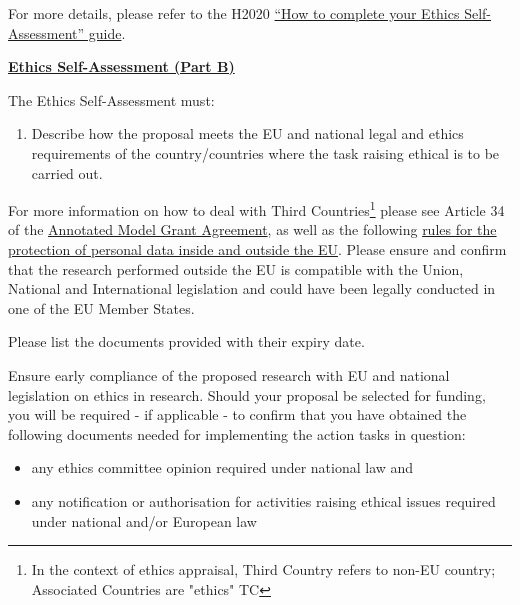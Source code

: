 For more details, please refer to the H2020
\href{http://ec.europa.eu/research/participants/data/ref/h2020/grants_manual/hi/ethics/h2020_hi_ethics-self-assess_en.pdf}{``How
to complete your Ethics Self-Assessment'' guide}.

\bigskip\noindent

{\large {\bf \ul{Ethics Self-Assessment (Part B)}}}

\medskip\noindent
The Ethics Self-Assessment must:

{\bf
\begin{enumerate}
  \item Describe how the proposal meets the EU and national legal and ethics requirements of the country/countries where the task raising ethical is to be carried out.
\end{enumerate}
}

\medskip\noindent
For more information on how to deal with Third Countries\footnote{In the
context of ethics appraisal, Third Country refers to non-EU
country; Associated Countries are "ethics" TC} please see Article
34 of the
\href{http://ec.europa.eu/research/participants/data/ref/h2020/grants_manual/amga/h2020-amga_en.pdf}{Annotated
Model Grant Agreement}, as well as the following
\href{https://ec.europa.eu/info/law/law-topic/data-protection_en}{rules
for the protection of personal data inside and outside the EU}.
Please ensure and confirm that the research performed outside the
EU is compatible with the Union, National and International
legislation and could have been legally conducted in one of the EU
Member States. 

\medskip\noindent

Please list the documents provided with their expiry date.

\medskip\noindent
Ensure early compliance of the proposed research with EU and
national legislation on ethics in research.  Should your proposal
be selected for funding, you will be required - if applicable - to
confirm that you have obtained the following documents needed for
implementing the action tasks in question:
\begin{itemize}
  \item 
    any ethics committee opinion required under national law and 
  \item
    any notification or authorisation for activities raising
    ethical issues required under national and/or European law 
\end{itemize}

\medskip\noindent

